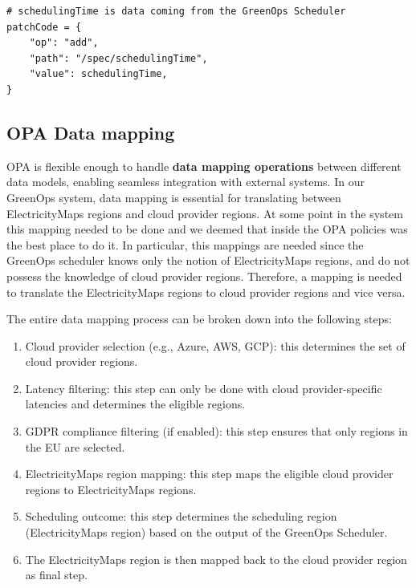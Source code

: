 \begin{lstlisting}[language=rego, caption={JSON Patch example}, label={lst:json_patch}]
# schedulingTime is data coming from the GreenOps Scheduler
patchCode = {
	"op": "add",
	"path": "/spec/schedulingTime",
	"value": schedulingTime,
}
\end{lstlisting}

\subsection{OPA Data mapping}

OPA is flexible enough to handle \textbf{data mapping operations} between different data models, enabling seamless integration with external systems. 
In our GreenOps system, data mapping is essential for translating between ElectricityMaps regions and cloud provider regions. 
At some point in the system this mapping needed to be done and we deemed that inside the OPA policies was the best place to
do it.
In particular, this mappings are needed since the GreenOps scheduler knows only the notion of ElectricityMaps regions, and do not possess the knowledge of cloud provider regions. 
Therefore, a mapping is needed to translate the ElectricityMaps regions to cloud provider regions and vice versa.

The entire data mapping process can be broken down into the following steps:
\begin{enumerate}[itemsep=0.2pt, topsep=1pt]
  \item Cloud provider selection (e.g., Azure, AWS, GCP): this determines the set of cloud provider regions.
  \item Latency filtering: this step can only be done with cloud provider-specific latencies and determines the eligible regions.
  \item GDPR compliance filtering (if enabled): this step ensures that only regions in the EU are selected.
  \item ElectricityMaps region mapping: this step maps the eligible cloud provider regions to ElectricityMaps regions.
  \item Scheduling outcome: this step determines the scheduling region (ElectricityMaps region) based on the output of the GreenOps Scheduler.
  \item The ElectricityMaps region is then mapped back to the cloud provider region as final step. \newline
\end{enumerate}

